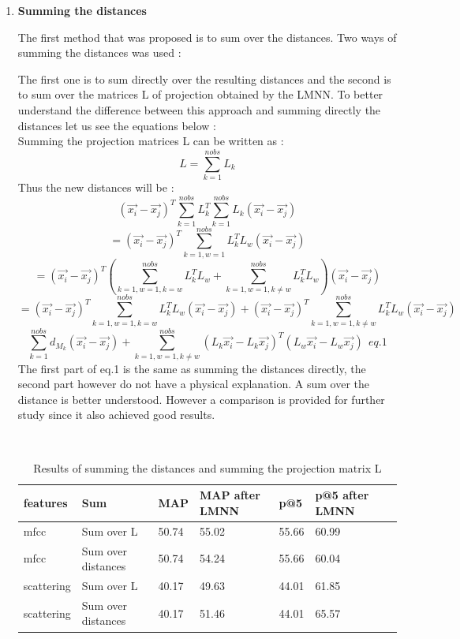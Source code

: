 \documentclass[hidelinks,12pt]{report}
\begin{document}
\begin{enumerate}
\item \textbf{Summing the distances} \par 
The first method that was proposed is to sum over the distances. Two ways of summing the distances was used :\par The first one is to sum directly over the resulting distances and the second is to sum over the matrices L of projection obtained by the LMNN. To better understand the difference between this approach and summing directly the distances let us see the equations below : \\
Summing the projection matrices L can be written as :
$$L=\sum_{k=1}^{nobs}L_k$$
Thus the new distances will be :
 $$(\vec{x_i}-\vec{x_j})^T\sum_{k=1}^{nobs}L_k^T\sum_{k=1}^{nobs}L_k(\vec{x_i}-\vec{x_j})$$
  $$=(\vec{x_i}-\vec{x_j})^T\sum_{k=1,w=1}^{nobs}L_k^TL_w(\vec{x_i}-\vec{x_j})$$
  $$=(\vec{x_i}-\vec{x_j})^T(\sum_{k=1,w=1,k=w}^{nobs}L_k^TL_w+\sum_{k=1,w=1,k\neq w}^{nobs}L_k^TL_w)(\vec{x_i}-\vec{x_j})$$
   $$=(\vec{x_i}-\vec{x_j})^T\sum_{k=1,w=1,k=w}^{nobs}L_k^TL_w(\vec{x_i}-\vec{x_j})+(\vec{x_i}-\vec{x_j})^T\sum_{k=1,w=1,k\neq w}^{nobs}L_k^TL_w(\vec{x_i}-\vec{x_j})$$
  $$\sum_{k=1}^{nobs}d_{M_k}(\vec{x_i}-\vec{x_j})+\sum_{k=1,w=1,k\neq w}^{nobs}(L_k\vec{x_i}-L_k\vec{x_j})^T(L_w\vec{x_i}-L_w\vec{x_j})\ \ eq.1$$
 The first part of eq.1 is the same as summing the distances directly, the second part however do not have a physical explanation. A sum over the distance is better understood. However a comparison is provided for further study since it also achieved good results.
 
 \begin{table}[H]
\begin{center} 
\ 
 \setlength{\tabcolsep}{.16667em} 
\begin{tabular}{ | l | l | l | l | l | l | l |} 
\hline
features & Sum & MAP & MAP after LMNN & p@5 & p@5 after LMNN  \\ 
\hline 
mfcc & Sum over L& 50.74 &55.02 & 55.66 & 60.99 \\ 
mfcc & Sum over distances & 50.74 & 54.24 & 55.66 & 60.04  \\ 
scattering& Sum over L & 40.17 & 49.63 & 44.01 & 61.85  \\ 
scattering & Sum over distances & 40.17 & 51.46 & 44.01 & 65.57  \\
\hline
\end{tabular} 
\end{center} 
\caption{Results of summing the distances and summing the projection matrix L} 
\label{you} 
\end{table}
 

\end{enumerate}
\end{document}
